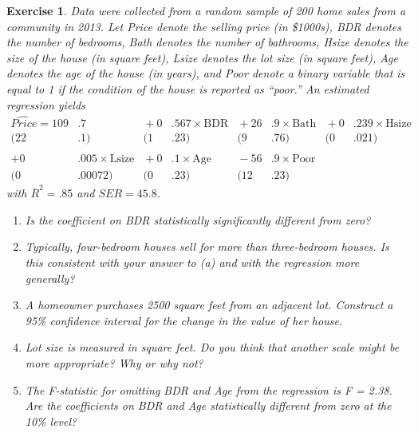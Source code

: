 \documentclass{article}
\newtheorem{exercise}[theorem]{Exercise}
\begin{document}
\begin{exercise}  %
Data were collected from a random sample of 200 home sales from a community in 2013. Let Price denote the selling price (in \$1000s), BDR denotes the number of bedrooms, Bath denotes the number of bathrooms, Hsize denotes the size of the house (in square feet), Lsize denotes the lot size (in square feet), Age denotes the age of the house (in years), and Poor denote a binary variable that is equal to 1 if the condition of the house is reported as “poor.” An estimated regression yields
\begin{equation*}
    \begin{alignedat}{5}
    \widehat{Price}
    = 109&.7 &{}
    +0&.567 \times \mathrm{BDR} &{}
    + 26&.9 \times \mathrm{Bath} &{}
    + 0&.239 \times \mathrm{Hsize} &{}\\
    (22&.1)& (1&.23)& (9&.76)& (0&.021)\\\\
 + 0&.005 \times \mathrm{Lsize} &{}
    + 0&.1 \times \mathrm{Age} &{}
    - 56&.9 \times \mathrm{Poor} &{} \\
(0&.00072)& (0&.23)& (12&.23)&
  \end{alignedat}
\end{equation*}
with $\overline{R}^2=.85$ and $SER = 45.8$.

    \begin{enumerate}[label=(\alph*)]
    \item Is the coefficient on BDR statistically significantly different from zero?
    \item Typically, four-bedroom houses sell for more than three-bedroom houses. Is this consistent with your answer to (a) and with the regression more generally?
    \item A homeowner purchases 2500 square feet from an adjacent lot. Construct a 95\% confidence interval for the change in the value of her house.
    \item Lot size is measured in square feet. Do you think that another scale might be more appropriate? Why or why not?
    \item The F-statistic for omitting BDR and Age from the regression is F = 2.38. Are the coefficients on BDR and Age statistically different from zero at the 10\% level?
    \end{enumerate}
    
\end{exercise}
\end{document}
